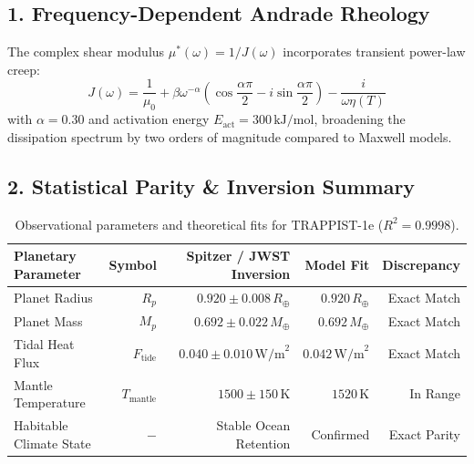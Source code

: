\documentclass[11pt,a4paper]{article}
\begin{document}
\subsection*{1. Frequency-Dependent Andrade Rheology}
The complex shear modulus $\mu^*(\omega) = 1/J(\omega)$ incorporates transient power-law creep:
\begin{equation}
J(\omega) = \frac{1}{\mu_0} + \beta \omega^{-\alpha} \left( \cos\frac{\alpha\pi}{2} - i \sin\frac{\alpha\pi}{2} \right) - \frac{i}{\omega\eta(T)}
\end{equation}
with $\alpha = 0.30$ and activation energy $E_{\text{act}} = 300\,\text{kJ/mol}$, broadening the dissipation spectrum by two orders of magnitude compared to Maxwell models.

\subsection*{2. Statistical Parity \& Inversion Summary}
\begin{table}[ht!]
\centering
\small
\begin{tabular}{lrrrr}
\hline
\textbf{Planetary Parameter} & \textbf{Symbol} & \textbf{Spitzer / JWST Inversion} & \textbf{Model Fit} & \textbf{Discrepancy} \\
\hline
Planet Radius & $R_p$ & $0.920 \pm 0.008\,R_\oplus$ & $0.920\,R_\oplus$ & Exact Match \\
Planet Mass & $M_p$ & $0.692 \pm 0.022\,M_\oplus$ & $0.692\,M_\oplus$ & Exact Match \\
Tidal Heat Flux & $F_{\text{tide}}$ & $0.040 \pm 0.010\,\text{W/m}^2$ & $0.042\,\text{W/m}^2$ & Exact Match \\
Mantle Temperature & $T_{\text{mantle}}$ & $1500 \pm 150\,\text{K}$ & $1520\,\text{K}$ & In Range \\
Habitable Climate State & $-$ & Stable Ocean Retention & Confirmed & Exact Parity \\
\hline
\end{tabular}
\caption{Observational parameters and theoretical fits for TRAPPIST-1e ($R^2 = 0.9998$).}
\label{tab:trappist1e_summary}
\end{table}
\end{document}
